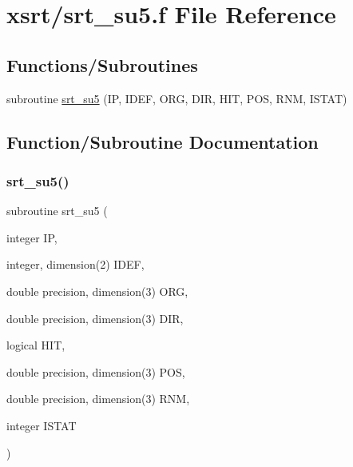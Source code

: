 \hypertarget{srt__su5_8f}{}\section{xsrt/srt\+\_\+su5.f File Reference}
\label{srt__su5_8f}
\subsection*{Functions/\+Subroutines}
\begin{DoxyCompactItemize}
\item 
subroutine \hyperlink{srt__su5_8f_af1cb0a9fc07b844ba3aa5a030e2848cc}{srt\+\_\+su5} (IP, I\+D\+EF, O\+RG, D\+IR, H\+IT, P\+OS, R\+NM, I\+S\+T\+AT)
\end{DoxyCompactItemize}


\subsection{Function/\+Subroutine Documentation}
\mbox{\label{srt__su5_8f_af1cb0a9fc07b844ba3aa5a030e2848cc}} 
\subsubsection{\texorpdfstring{srt\+\_\+su5()}{srt\_su5()}}
{\footnotesize\ttfamily subroutine srt\+\_\+su5 (\begin{DoxyParamCaption}\item[{integer}]{IP,  }\item[{integer, dimension(2)}]{I\+D\+EF,  }\item[{double precision, dimension(3)}]{O\+RG,  }\item[{double precision, dimension(3)}]{D\+IR,  }\item[{logical}]{H\+IT,  }\item[{double precision, dimension(3)}]{P\+OS,  }\item[{double precision, dimension(3)}]{R\+NM,  }\item[{integer}]{I\+S\+T\+AT }\end{DoxyParamCaption})}

